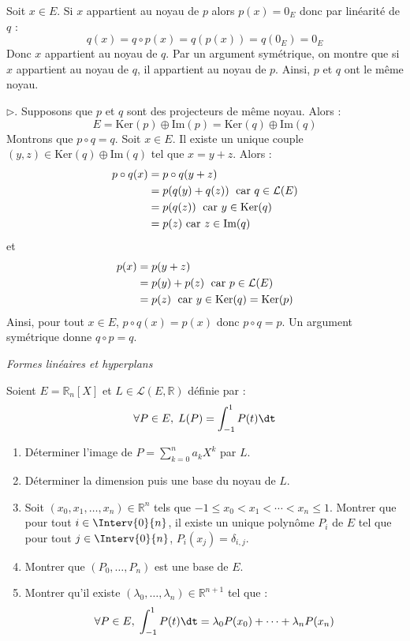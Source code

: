 \documentclass[a4paper,10pt]{report}
\begin{document}
\medskip

\noindent Soit $x \in E$. Si $x$ appartient au noyau de $p$ alors $p(x) = 0_E$ donc par linéarité de $q$ :
$$ q(x)= q \circ p(x) = q(p(x))=q(0_E) = 0_E$$
Donc $x$ appartient au noyau de $q$. Par un argument symétrique, on montre que si $x$ appartient au noyau de $q$, il appartient au noyau de $p$. Ainsi, $p$ et $q$ ont le même noyau.

\medskip

\noindent $\rhd$. Supposons que $p$ et $q$ sont des projecteurs de même noyau. Alors :
$$ E = \textrm{Ker}(p) \oplus \textrm{Im}(p) = \textrm{Ker}(q) \oplus \textrm{Im}(q)$$
Montrons que $p \circ q= q$. Soit $x \in E$. Il existe un unique couple $(y,z) \in \textrm{Ker}(q) \oplus \textrm{Im}(q)$ tel que $x=y+z$. Alors :
\begin{align*}
p \circ q(x) & = p\circ q (y+z) \\
& = p (q(y)+q(z))  \; \hbox{ car } q \in \mathcal{L}(E) \\
& = p (q(z))   \; \hbox{ car } y \in \textrm{Ker}(q) \\
& = p(z) \hbox{ car } z \in \textrm{Im}(q)
\end{align*}
et 
\begin{align*}
p(x) & = p(y+z) \\
& = p(y)+p(z) \; \hbox{ car } p \in \mathcal{L}(E) \\
& =  p(z) \; \hbox{ car } y \in \textrm{Ker}(q) = \textrm{Ker}(p)
\end{align*}
Ainsi, pour tout $x \in E$, $p \circ q(x)=p(x)$ donc $p \circ q = p$. Un argument symétrique donne $q \circ p = q$.





\medskip

\begin{center}
\textit{{ {\large Formes linéaires et hyperplans}}}
\end{center}

\medskip

\begin{Exa} Soient $E= \mathbb{R}_n[X]$ et $L \in \mathcal{L}(E, \mathbb{R})$ définie par :
$$ \forall P \in E, \;  L(P) = \int_{-1}^1 P(t) \dt$$
\begin{enumerate}
\item Déterminer l'image de $P= \sum_{k=0}^n a_k X^k$ par $L$.
\item Déterminer la dimension puis une base du noyau de $L$.
\item Soit $(x_0, x_1, \ldots, x_n) \in \mathbb{R}^n$ tels que $-1 \leq x_0 < x_1 < \cdots < x_n \leq 1$. Montrer que pour tout $i \in \Interv{0}{n}$, il existe un unique polynôme $P_i$ de $E$ tel que pour tout $j \in \Interv{0}{n}$, $P_i(x_j)= \delta_{i,j}$.
\item Montrer que $(P_0, \ldots, P_n)$ est une base de $E$.
\item Montrer qu'il existe $(\lambda_0, \ldots, \lambda_n) \in \mathbb{R}^{n+1}$ tel que :
$$ \forall P \in E, \; \int_{-1}^1 P(t) \dt = \lambda_0 P(x_0) + \cdots + \lambda_n P(x_n)$$
\end{enumerate}
\end{Exa}
\end{document}

